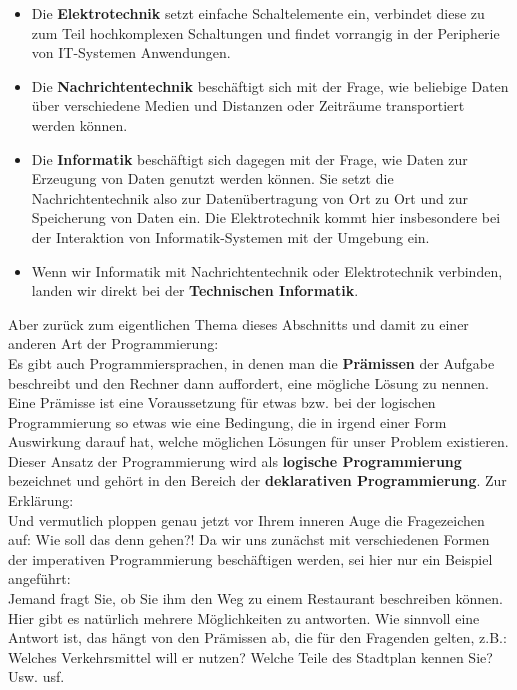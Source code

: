 \begin{itemize}
	\item Die \textbf{Elektrotechnik} setzt einfache Schaltelemente ein, verbindet diese zu zum Teil hochkomplexen Schaltungen und findet vorrangig in der Peripherie von IT-Systemen Anwendungen.
	\item Die \textbf{Nachrichtentechnik} beschäftigt sich mit der Frage, wie beliebige Daten über verschiedene Medien und Distanzen oder Zeiträume transportiert werden können.
	\item Die \textbf{Informatik} beschäftigt sich dagegen mit der Frage, wie Daten zur Erzeugung von Daten genutzt werden können. Sie setzt die Nachrichtentechnik also zur Datenübertragung von Ort zu Ort und zur Speicherung von Daten ein. Die Elektrotechnik kommt hier insbesondere bei der Interaktion von Informatik-Systemen mit der Umgebung ein. 
	\item Wenn wir Informatik mit Nachrichtentechnik oder Elektrotechnik verbinden, landen wir direkt bei der \textbf{Technischen Informatik}.
\end{itemize}

Aber zurück zum eigentlichen Thema dieses Abschnitts und damit zu einer anderen Art der Programmierung: \\

Es gibt auch Programmiersprachen, in denen man die \textbf{Prämissen} der Aufgabe beschreibt und den Rechner dann auffordert, eine mögliche Lösung zu nennen.  Eine Prämisse ist eine Voraussetzung für etwas bzw. bei der logischen Programmierung so etwas wie eine Bedingung, die in irgend einer Form Auswirkung darauf hat, welche möglichen Lösungen für unser Problem existieren. Dieser Ansatz der Programmierung wird als \textbf{logische Programmierung} bezeichnet und gehört in den Bereich der \textbf{deklarativen Programmierung}. Zur Erklärung:\\

Und vermutlich ploppen genau jetzt vor Ihrem inneren Auge die Fragezeichen auf: Wie soll das denn gehen?! Da wir uns zunächst mit verschiedenen Formen der imperativen Programmierung beschäftigen werden, sei hier nur ein Beispiel angeführt: \\

Jemand fragt Sie, ob Sie ihm den Weg zu einem Restaurant beschreiben können. Hier gibt es natürlich mehrere Möglichkeiten zu antworten. Wie sinnvoll eine Antwort ist, das hängt von den Prämissen ab, die für den Fragenden gelten, z.B.: Welches Verkehrsmittel will er nutzen? Welche Teile des Stadtplan kennen Sie? Usw. usf. \\


